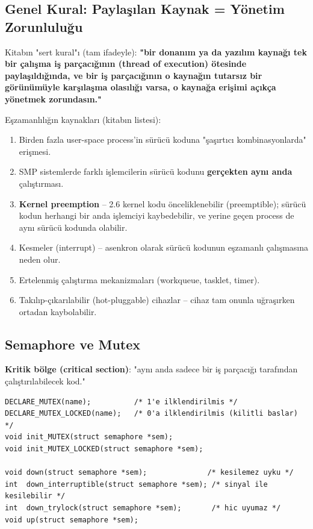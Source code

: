 \documentclass[11pt,a4paper]{article}
\begin{document}
\subsection{Genel Kural: Payla\c{s}\i lan Kaynak = Y\"onetim Zorunlulu\u{g}u}

Kitabın "sert kural"ı (tam ifadeyle): \textbf{"bir donanım ya da
yazılım kaynağı tek bir çalışma iş parçacığının (thread of execution)
ötesinde paylaşıldığında, ve bir iş parçacığının o kaynağın tutarsız
bir görünümüyle karşılaşma olasılığı varsa, o kaynağa erişimi açıkça
yönetmek zorundasın."}

Eşzamanlılığın kaynakları (kitabın listesi):
\begin{enumerate}[leftmargin=1.2cm]
  \item Birden fazla user-space process'in sürücü koduna "şaşırtıcı
  kombinasyonlarda" erişmesi.
  \item SMP sistemlerde farklı işlemcilerin sürücü kodunu \textbf{gerçekten
  aynı anda} çalıştırması.
  \item \textbf{Kernel preemption} -- 2.6 kernel kodu önceliklenebilir
  (preemptible); sürücü kodun herhangi bir anda işlemciyi kaybedebilir,
  ve yerine geçen process de aynı sürücü kodunda olabilir.
  \item Kesmeler (interrupt) -- asenkron olarak sürücü kodunun eşzamanlı
  çalışmasına neden olur.
  \item Ertelenmiş çalıştırma mekanizmaları (workqueue, tasklet, timer).
  \item Takılıp-çıkarılabilir (hot-pluggable) cihazlar -- cihaz tam
  onunla uğraşırken ortadan kaybolabilir.
\end{enumerate}

\subsection{Semaphore ve Mutex}

\textbf{Kritik bölge (critical section)}: "aynı anda sadece bir iş
parçacığı tarafından çalıştırılabilecek kod."

\begin{lstlisting}
DECLARE_MUTEX(name);          /* 1'e ilklendirilmis */
DECLARE_MUTEX_LOCKED(name);   /* 0'a ilklendirilmis (kilitli baslar) */
void init_MUTEX(struct semaphore *sem);
void init_MUTEX_LOCKED(struct semaphore *sem);

void down(struct semaphore *sem);              /* kesilemez uyku */
int  down_interruptible(struct semaphore *sem); /* sinyal ile kesilebilir */
int  down_trylock(struct semaphore *sem);       /* hic uyumaz */
void up(struct semaphore *sem);
\end{lstlisting}
\end{document}
